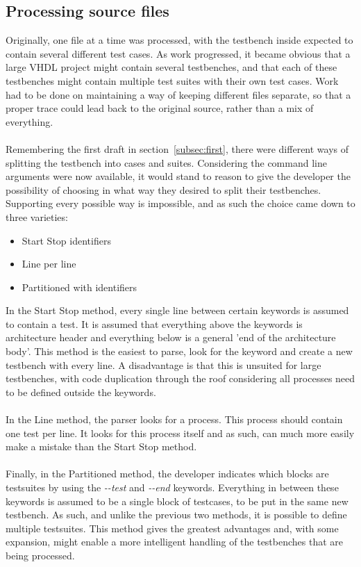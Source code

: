 \documentclass[11pt,british]{article}
\begin{document}
\subsection{Processing source files}
Originally, one file at a time was processed, with the testbench inside expected to contain several different test cases. As work progressed, it became obvious that a large \gls{VHDL} project might contain several testbenches, and that each of these testbenches might contain multiple test suites with their own test cases. Work had to be done on maintaining a way of keeping different files separate, so that a proper trace could lead back to the original source, rather than a mix of everything. \\
\\
Remembering the first draft in section~\ref{subsec:first}, there were different ways of splitting the testbench into cases and suites. Considering the command line arguments were now available, it would stand to reason to give the developer the possibility of choosing in what way they desired to split their testbenches. Supporting every possible way is impossible, and as such the choice came down to three varieties:
\begin{itemize}[itemsep=-0.1cm]
\item Start Stop identifiers
\item Line per line 
\item Partitioned with identifiers
\end{itemize}
In the Start Stop method, every single line between certain keywords is assumed to contain a test. It is assumed that everything above the keywords is architecture header and everything below is a general 'end of the architecture body'. This method is the easiest to parse, look for the keyword and create a new testbench with every line. A disadvantage is that this is unsuited for large testbenches, with code duplication through the roof considering all processes need to be defined outside the keywords.\\
\\
In the Line method, the parser looks for a process. This process should contain one test per line. It looks for this process itself and as such, can much more easily make a mistake than the Start Stop method.\\
\\
Finally, in the Partitioned method, the developer indicates which blocks are testsuites by using the \emph{-\--test} and \emph{-\--end} keywords. Everything in between these keywords is assumed to be a single block of testcases, to be put in the same new testbench. As such, and unlike the previous two methods, it is possible to define multiple testsuites. This method gives the greatest advantages and, with some expansion, might enable a more intelligent handling of the testbenches that are being processed.
\end{document}
